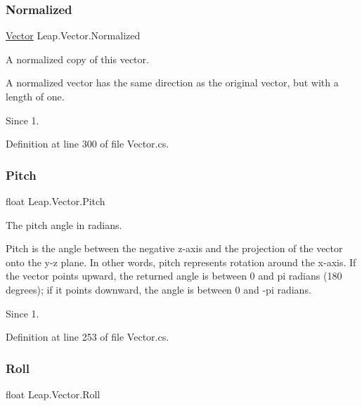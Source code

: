 \subsubsection{\texorpdfstring{Normalized}{Normalized}}
{\footnotesize\ttfamily \mbox{\hyperlink{struct_leap_1_1_vector}{Vector}} Leap.\+Vector.\+Normalized\hspace{0.3cm}{\ttfamily [get]}}



A normalized copy of this vector. 

A normalized vector has the same direction as the original vector, but with a length of one.

\begin{DoxySince}{Since}
1. 
\end{DoxySince}


Definition at line 300 of file Vector.\+cs.

\mbox{\label{struct_leap_1_1_vector_acc5105f55edfdc7a3d5cc6cd6cb8dc8f}} 
\subsubsection{\texorpdfstring{Pitch}{Pitch}}
{\footnotesize\ttfamily float Leap.\+Vector.\+Pitch\hspace{0.3cm}{\ttfamily [get]}}



The pitch angle in radians. 

Pitch is the angle between the negative z-\/axis and the projection of the vector onto the y-\/z plane. In other words, pitch represents rotation around the x-\/axis. If the vector points upward, the returned angle is between 0 and pi radians (180 degrees); if it points downward, the angle is between 0 and -\/pi radians.

\begin{DoxySince}{Since}
1. 
\end{DoxySince}


Definition at line 253 of file Vector.\+cs.

\mbox{\label{struct_leap_1_1_vector_afa775e6c104537383493e027f6a462f7}} 
\subsubsection{\texorpdfstring{Roll}{Roll}}
{\footnotesize\ttfamily float Leap.\+Vector.\+Roll\hspace{0.3cm}{\ttfamily [get]}}



